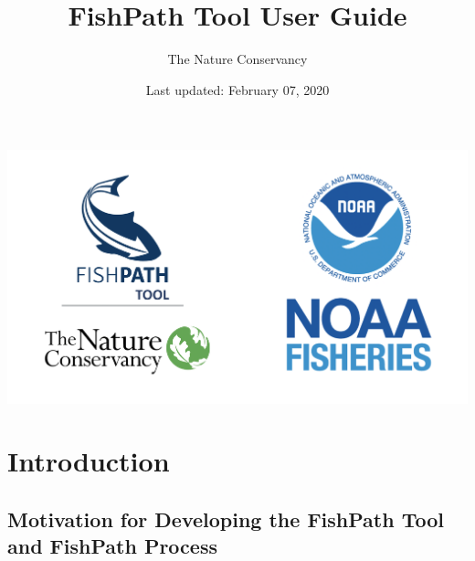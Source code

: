\documentclass[11pt,]{book}
\title{FishPath Tool User Guide}
\author{The Nature Conservancy}
\date{Last updated: February 07, 2020}
\begin{document}
\maketitle

{
\setcounter{tocdepth}{1}
\tableofcontents
}
\hypertarget{section}{%
\chapter*{}\label{section}}

\begin{center}\includegraphics[width=0.75\linewidth]{images/fp-noaa-logos} \end{center}

\hypertarget{intro}{%
\chapter{Introduction}\label{intro}}

\hypertarget{motivation}{%
\section{Motivation for Developing the FishPath Tool and FishPath Process}\label{motivation}}
\end{document}
